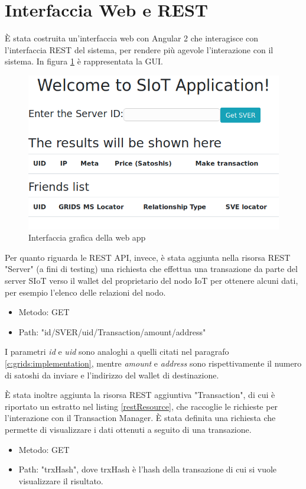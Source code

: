 \section{Interfaccia Web e REST}
\label{c:integr:webrest}

È stata costruita un'interfaccia web con Angular 2 che interagisce con l'interfaccia REST\cite{FerreiraFilho2009} del sistema, per rendere più agevole l'interazione con il sistema. In figura \ref{f:integr:gui-web} è rappresentata la GUI.

\begin{figure}[h!t]
\centerline{\includegraphics[scale=2.5]{img/gui-web-app}}
\caption{Interfaccia grafica della web app}
\label{f:integr:gui-web}
\end{figure}

Per quanto riguarda le REST API, invece, è stata aggiunta nella risorsa REST "Server" (a fini di testing) una richiesta che effettua una transazione da parte del server SIoT verso il wallet del proprietario del nodo IoT per ottenere alcuni dati, per esempio l'elenco delle relazioni del nodo.
\begin{itemize}
    \item Metodo: GET
    \item Path: "{id}/SVER/{uid}/Transaction/{amount}/{address}"
\end{itemize}

I parametri \textit{id} e \textit{uid} sono analoghi a quelli citati nel paragrafo \ref{c:grids:implementation}, mentre \textit{amount} e \textit{address} sono rispettivamente il numero di satoshi da inviare e l'indirizzo del wallet di destinazione.

È stata inoltre aggiunta la risorsa REST aggiuntiva "Transaction", di cui è riportato un estratto nel listing \ref{restResource}, che raccoglie le richieste per l'interazione con il Transaction Manager. È stata definita una richiesta che permette di visualizzare i dati ottenuti a seguito di una transazione.
\begin{itemize}
    \item Metodo: GET
    \item Path: "{trxHash}", dove trxHash è l'hash della transazione di cui si vuole visualizzare il risultato.
\end{itemize}

